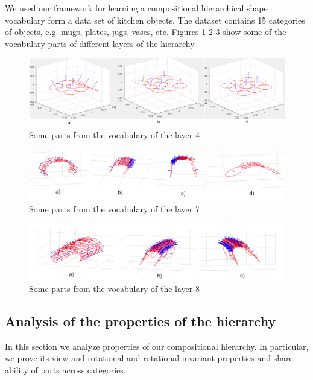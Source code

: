 \documentclass[conference]{IEEEtran}
\begin{document}
{We used our framework for learning a compositional hierarchical
shape vocabulary form a data set of kitchen objects. The dataset
contains 15 categories of objects, e.g. mugs, plates, jugs, vases,
etc. Figures \ref{fig:parts4} \ref{fig:parts7} \ref{fig:parts8} show
some of the vocabulary parts of different layers of the hierarchy.
\begin{figure}[t!]
\centering
\includegraphics[scale=0.3]{parts4}
\caption{Some parts from the vocabulary of the layer 4}
\label{fig:parts4}
\end{figure}
\begin{figure}[t!]
\centering
\includegraphics[scale=0.45]{parts7}
\caption{Some parts from the vocabulary of the layer 7}
\label{fig:parts7}
\end{figure}
\begin{figure}[t!]
\centering
\includegraphics[scale=0.45]{parts8}
\caption{Some parts from the vocabulary of the layer 8}
\label{fig:parts8}
\end{figure}

\subsection{Analysis of the properties of the hierarchy\label{sec:DataSet}}

In this section we analyze properties of our compositional
hierarchy. In particular, we prove its view and rotational and
rotational-invariant properties and share-ability of parts across
categories.

}
\end{document}

